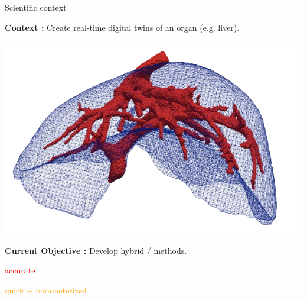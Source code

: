 \begin{frame}{Scientific context}
	\begin{minipage}{0.78\linewidth}
		\textbf{Context :} Create real-time digital twins of an organ (e.g. liver).
	\end{minipage}
	\begin{minipage}{0.18\linewidth}
		\vspace{-20pt}
		\includegraphics[width=0.95\linewidth]{images/intro/foie.png}
	\end{minipage}
	
	\vspace{3pt}
	\textbf{Current Objective :} Develop hybrid  /  methods.
	
	\vspace{1pt}
	\small
	\hspace{150pt} \begin{minipage}{0.14\linewidth}
		\textcolor{red}{accurate}
	\end{minipage} \hspace{10pt} \begin{minipage}{0.3\linewidth}
		\textcolor{orange}{quick + parameterized}
	\end{minipage}

	\vspace{-2pt}

	\normalsize
	\begin{center}
		\begin{tcolorbox}[
			colback=white, %
			colframe=other, %
			arc=2mm, %
			boxrule=0.5pt, %
			breakable, enhanced jigsaw,
			width=0.8\linewidth
			]
			

\end{tcolorbox}
\end{center}
\end{frame}
